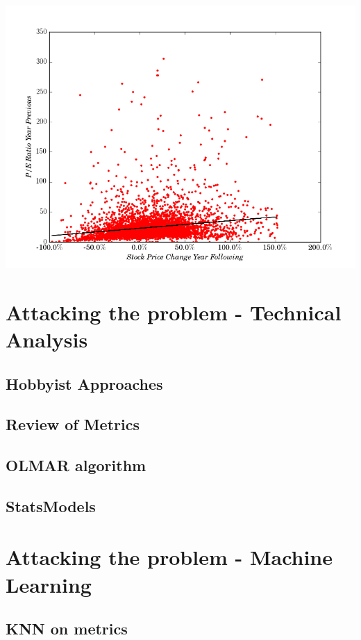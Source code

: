\documentclass{report}
\begin{document}
\centerline{\includegraphics[width=1.2\textwidth]{../work/fundamentals/absolute_pe_ratio_returns.png}}

\section{Attacking the problem - Technical Analysis}
\subsection{Hobbyist Approaches}
\subsection{Review of Metrics}
\subsection{OLMAR algorithm}
\subsection{StatsModels}

\section{Attacking the problem - Machine Learning}
\subsection{KNN on metrics}

\cite {website:pybrain-tutorial}



\end{document}
